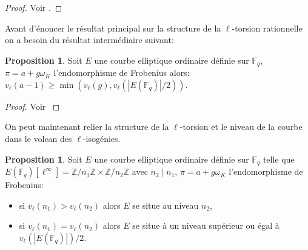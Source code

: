 \documentclass[10pt,a4paper]{book}
\theoremstyle{plain}
\theoremstyle{definition}
\theoremstyle{definition}
\theoremstyle{definition}
\theoremstyle{definition}
\newtheorem{prop}[thm]{Proposition}
\theoremstyle{definition}
\theoremstyle{remark}
\theoremstyle{remark}
\theoremstyle{definition}
\begin{document}
\begin{proof}
Voir  \cite[Lemma 1]{Ruck1987}.
\end{proof}

Avant d'énoncer le résultat principal sur la structure de la $\ell$-torsion rationnelle on a besoin du résultat intermédiaire suivant:

\begin{prop}
Soit $E$ une courbe elliptique ordinaire définie sur $\mathbb{F}_q$, $\pi=a+g 
\omega_K$ l'endomorphisme de Frobenius alors: $v_{\ell}(a-1) \geqslant \min(v_{\ell}(g),v_{\ell}(|E(\mathbb{F}_q)|/2))$.
\end{prop}

\begin{proof}
Voir \cite[Lemma 5.2]{Ionica2010}
\end{proof}

On peut maintenant relier la structure de la $\ell$-torsion et le niveau de la courbe dans le volcan des $\ell$-isogénies.

\begin{prop}
\label{pro:niv:str}
Soit $E$ une courbe elliptique ordinaire définie sur $\mathbb{F}_q$ telle que 
$E(\mathbb{F}_q)[\ell^{\infty}]=\mathbb{Z}/n_1\mathbb{Z} \times
\mathbb{Z}/n_2\mathbb{Z}$ avec $n_2 \mid n_1$, $\pi = a + g \omega_K$ 
l'endomorphisme de Frobenius: 
\begin{itemize}
\item si $v_{\ell}(n_1)>v_{\ell}(n_2)$ alors $E$ se situe au niveau $n_2$,
\item si $v_{\ell}(n_1)=v_{\ell}(n_2)$ alors $E$ se situe à un niveau supérieur ou égal à $v_{\ell}(|E(\mathbb{F}_q)|)/2$.
\end{itemize}
\end{prop}
\end{document}

